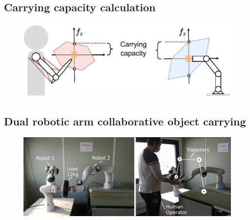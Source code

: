 \subsection{Carrying capacity calculation}

\begin{figure}[!h]
    \centering
    \includegraphics[width=0.6\linewidth]{Chapters/imgs/carrying_capacity.pdf}
    \caption{}
    \label{fig:collaboartion_schema}
\end{figure}




\subsection{Dual robotic arm collaborative object carrying}\label{ch:robot_robot_carrying}

\begin{figure}[!h]
    \centering
    \includegraphics[width=\linewidth]{Papers/images/exp1_explication.png}
    \caption{}
    \label{fig:experiment1}
\end{figure}


